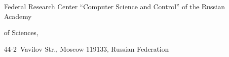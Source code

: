\titel{\tit}{\aut}{\autkol}{\titkol}





\vspace*{-8pt}





\noindent


Federal Research Center ``Computer Science and Control'' of the Russian Academy 


of Sciences,  


44-2~Vavilov Str., Moscow 119133, Russian Federation








\def\leftfootline{\small{\textbf{\thepage}


\hfill Sistemy i Sredstva Informatiki~---


Systems and Means of Informatics 2022 vol~32 no\,4}


}%


 \def\rightfootline{\small{Sistemy i Sredstva Informatiki~---


 Systems and Means of Informatics 2022 vol~32 no\,4


\hfill \textbf{\thepage}}}





\vspace*{3pt}


  





  


